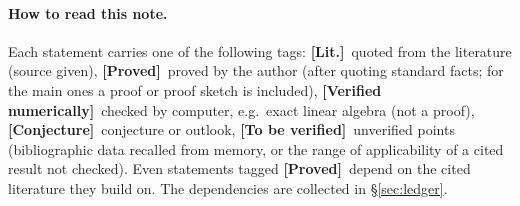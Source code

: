 \documentclass[11pt,a4paper]{article}
\newcommand{\tP}{\textcolor{green!45!black}{\textbf{[Proved]}}\xspace}
\newcommand{\tC}{\textcolor{blue!55!black}{\textbf{[Lit.]}}\xspace}
\newcommand{\tV}{\textcolor{violet!80!black}{\textbf{[Verified numerically]}}\xspace}
\newcommand{\tK}{\textcolor{red!70!black}{\textbf{[Conjecture]}}\xspace}
\newcommand{\tQ}{\textcolor{orange!85!black}{\textbf{[To be verified]}}\xspace}
\theoremstyle{definition}
\begin{document}
\paragraph{How to read this note.}
Each statement carries one of the following tags: \tC\ quoted from the literature (source given), \tP\ proved by the author (after quoting standard facts; for the main ones a proof or proof sketch is included), \tV\ checked by computer, e.g.\ exact linear algebra (not a proof), \tK\ conjecture or outlook, \tQ\ unverified points (bibliographic data recalled from memory, or the range of applicability of a cited result not checked).
Even statements tagged \tP\ depend on the cited literature they build on. The dependencies are collected in \S\ref{sec:ledger}.

\tableofcontents











\end{document}
